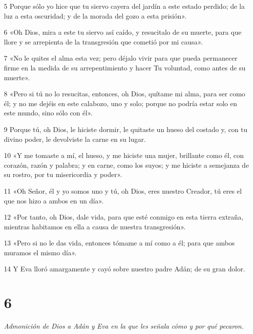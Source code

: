 \par 5 Porque sólo yo hice que tu siervo cayera del jardín a este estado perdido; de la luz a esta oscuridad; y de la morada del gozo a esta prisión».

\par 6 «Oh Dios, mira a este tu siervo así caído, y resucitalo de su muerte, para que llore y se arrepienta de la transgresión que cometió por mi causa».

\par 7 «No le quites el alma esta vez; pero déjalo vivir para que pueda permanecer firme en la medida de su arrepentimiento y hacer Tu voluntad, como antes de su muerte».

\par 8 «Pero si tú no lo resucitas, entonces, oh Dios, quítame mi alma, para ser como él; y no me dejéis en este calabozo, uno y solo; porque no podría estar solo en este mundo, sino sólo con él».

\par 9 Porque tú, oh Dios, le hiciste dormir, le quitaste un hueso del costado y, con tu divino poder, le devolviste la carne en su lugar.

\par 10 «Y me tomaste a mí, el hueso, y me hiciste una mujer, brillante como él, con corazón, razón y palabra; y en carne, como los suyos; y me hiciste a semejanza de su rostro, por tu misericordia y poder».

\par 11 «Oh Señor, él y yo somos uno y tú, oh Dios, eres nuestro Creador, tú eres el que nos hizo a ambos en un día».

\par 12 «Por tanto, oh Dios, dale vida, para que esté conmigo en esta tierra extraña, mientras habitamos en ella a causa de nuestra transgresión».

\par 13 «Pero si no le das vida, entonces tómame a mí como a él; para que ambos muramos el mismo día».

\par 14 Y Eva lloró amargamente y cayó sobre nuestro padre Adán; de su gran dolor.

\chapter{6}

\par \textit{Admonición de Dios a Adán y Eva en la que les señala cómo y por qué pecaron.}

